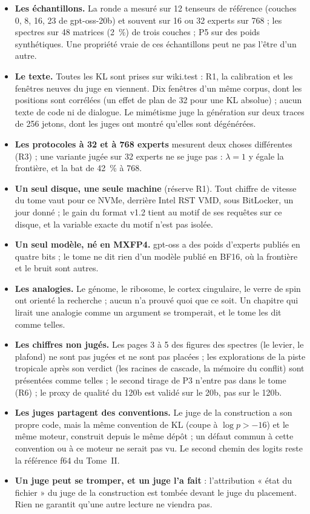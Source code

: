 \begin{faux}
\begin{itemize}
\item \textbf{Les échantillons.} La ronde a mesuré sur 12 tenseurs de référence (couches 0, 8, 16, 23 de gpt-oss-20b) et souvent sur 16 ou 32 experts sur 768 ; les spectres sur 48 matrices (\SI{2}{\percent}) de trois couches ; P5 sur des poids synthétiques. Une propriété vraie de ces échantillons peut ne pas l'être d'un autre.
\item \textbf{Le texte.} Toutes les KL sont prises sur wiki.test : R1, la calibration et les fenêtres neuves du juge en viennent. Dix fenêtres d'un même corpus, dont les positions sont corrélées (un effet de plan de 32 pour une KL absolue) ; aucun texte de code ni de dialogue. Le mimétisme juge la génération sur deux traces de 256 jetons, dont les juges ont montré qu'elles sont dégénérées.
\item \textbf{Les protocoles à 32 et à 768 experts} mesurent deux choses différentes (R3) ; une variante jugée sur 32 experts ne se juge pas : $\lambda = 1$ y égale la frontière, et la bat de \SI{42}{\percent} à 768.
\item \textbf{Un seul disque, une seule machine} (réserve R1). Tout chiffre de vitesse du tome vaut pour ce NVMe, derrière Intel RST VMD, sous BitLocker, un jour donné ; le gain du format v1.2 tient au motif de ses requêtes sur ce disque, et la variable exacte du motif n'est pas isolée.
\item \textbf{Un seul modèle, né en MXFP4.} gpt-oss a des poids d'experts publiés en quatre bits ; le tome ne dit rien d'un modèle publié en BF16, où la frontière et le bruit sont autres.
\item \textbf{Les analogies.} Le génome, le ribosome, le cortex cingulaire, le verre de spin ont orienté la recherche ; aucun n'a prouvé quoi que ce soit. Un chapitre qui lirait une analogie comme un argument se tromperait, et le tome les dit comme telles.
\item \textbf{Les chiffres non jugés.} Les pages 3 à 5 des figures des spectres (le levier, le plafond) ne sont pas jugées et ne sont pas placées ; les explorations de la piste tropicale après son verdict (les racines de cascade, la mémoire du conflit) sont présentées comme telles ; le second tirage de P3 n'entre pas dans le tome (R6) ; le proxy de qualité du 120b est validé sur le 20b, pas sur le 120b.
\item \textbf{Les juges partagent des conventions.} Le juge de la construction a son propre code, mais la même convention de KL (coupe à $\log p > -16$) et le même moteur, construit depuis le même dépôt ; un défaut commun à cette convention ou à ce moteur ne serait pas vu. Le second chemin des logits reste la référence f64 du Tome~II.
\item \textbf{Un juge peut se tromper, et un juge l'a fait} : l'attribution « état du fichier » du juge de la construction est tombée devant le juge du placement. Rien ne garantit qu'une autre lecture ne viendra pas.
\end{itemize}
\end{faux}

